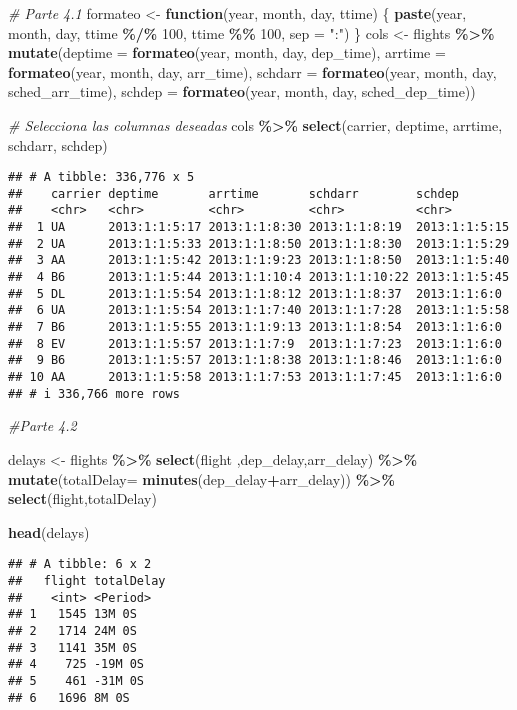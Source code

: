 \documentclass[
]{article}
\newenvironment{Shaded}{\begin{snugshade}}{\end{snugshade}}
\newcommand{\AttributeTok}[1]{\textcolor[rgb]{0.13,0.29,0.53}{#1}}
\newcommand{\CommentTok}[1]{\textcolor[rgb]{0.56,0.35,0.01}{\textit{#1}}}
\newcommand{\ControlFlowTok}[1]{\textcolor[rgb]{0.13,0.29,0.53}{\textbf{#1}}}
\newcommand{\DecValTok}[1]{\textcolor[rgb]{0.00,0.00,0.81}{#1}}
\newcommand{\FunctionTok}[1]{\textcolor[rgb]{0.13,0.29,0.53}{\textbf{#1}}}
\newcommand{\NormalTok}[1]{#1}
\newcommand{\OtherTok}[1]{\textcolor[rgb]{0.56,0.35,0.01}{#1}}
\newcommand{\SpecialCharTok}[1]{\textcolor[rgb]{0.81,0.36,0.00}{\textbf{#1}}}
\newcommand{\StringTok}[1]{\textcolor[rgb]{0.31,0.60,0.02}{#1}}
\begin{document}
\begin{Shaded}
\begin{Highlighting}[]
\CommentTok{\# Parte 4.1}
\NormalTok{formateo }\OtherTok{\textless{}{-}} \ControlFlowTok{function}\NormalTok{(year, month, day, ttime) \{}
  \FunctionTok{paste}\NormalTok{(year, month, day, ttime }\SpecialCharTok{\%/\%} \DecValTok{100}\NormalTok{, ttime }\SpecialCharTok{\%\%} \DecValTok{100}\NormalTok{, }\AttributeTok{sep =} \StringTok{":"}\NormalTok{)}
\NormalTok{\}}
\NormalTok{cols }\OtherTok{\textless{}{-}}\NormalTok{ flights }\SpecialCharTok{\%\textgreater{}\%} 
  \FunctionTok{mutate}\NormalTok{(}\AttributeTok{deptime =} \FunctionTok{formateo}\NormalTok{(year, month, day, dep\_time),}
         \AttributeTok{arrtime =} \FunctionTok{formateo}\NormalTok{(year, month, day, arr\_time),}
         \AttributeTok{schdarr =} \FunctionTok{formateo}\NormalTok{(year, month, day, sched\_arr\_time),}
         \AttributeTok{schdep =} \FunctionTok{formateo}\NormalTok{(year, month, day, sched\_dep\_time))}

\CommentTok{\# Selecciona las columnas deseadas}
\NormalTok{cols }\SpecialCharTok{\%\textgreater{}\%} \FunctionTok{select}\NormalTok{(carrier, deptime, arrtime, schdarr, schdep)}
\end{Highlighting}
\end{Shaded}

\begin{verbatim}
## # A tibble: 336,776 x 5
##    carrier deptime       arrtime       schdarr        schdep       
##    <chr>   <chr>         <chr>         <chr>          <chr>        
##  1 UA      2013:1:1:5:17 2013:1:1:8:30 2013:1:1:8:19  2013:1:1:5:15
##  2 UA      2013:1:1:5:33 2013:1:1:8:50 2013:1:1:8:30  2013:1:1:5:29
##  3 AA      2013:1:1:5:42 2013:1:1:9:23 2013:1:1:8:50  2013:1:1:5:40
##  4 B6      2013:1:1:5:44 2013:1:1:10:4 2013:1:1:10:22 2013:1:1:5:45
##  5 DL      2013:1:1:5:54 2013:1:1:8:12 2013:1:1:8:37  2013:1:1:6:0 
##  6 UA      2013:1:1:5:54 2013:1:1:7:40 2013:1:1:7:28  2013:1:1:5:58
##  7 B6      2013:1:1:5:55 2013:1:1:9:13 2013:1:1:8:54  2013:1:1:6:0 
##  8 EV      2013:1:1:5:57 2013:1:1:7:9  2013:1:1:7:23  2013:1:1:6:0 
##  9 B6      2013:1:1:5:57 2013:1:1:8:38 2013:1:1:8:46  2013:1:1:6:0 
## 10 AA      2013:1:1:5:58 2013:1:1:7:53 2013:1:1:7:45  2013:1:1:6:0 
## # i 336,766 more rows
\end{verbatim}

\begin{Shaded}
\begin{Highlighting}[]
\CommentTok{\#Parte 4.2}

\NormalTok{delays }\OtherTok{\textless{}{-}}\NormalTok{ flights }\SpecialCharTok{\%\textgreater{}\%}  \FunctionTok{select}\NormalTok{(flight ,dep\_delay,arr\_delay) }\SpecialCharTok{\%\textgreater{}\%} 
  \FunctionTok{mutate}\NormalTok{(}\AttributeTok{totalDelay=} \FunctionTok{minutes}\NormalTok{(dep\_delay}\SpecialCharTok{+}\NormalTok{arr\_delay)) }\SpecialCharTok{\%\textgreater{}\%} 
  \FunctionTok{select}\NormalTok{(flight,totalDelay)}


\FunctionTok{head}\NormalTok{(delays)}
\end{Highlighting}
\end{Shaded}

\begin{verbatim}
## # A tibble: 6 x 2
##   flight totalDelay
##    <int> <Period>  
## 1   1545 13M 0S    
## 2   1714 24M 0S    
## 3   1141 35M 0S    
## 4    725 -19M 0S   
## 5    461 -31M 0S   
## 6   1696 8M 0S
\end{verbatim}
\end{document}
